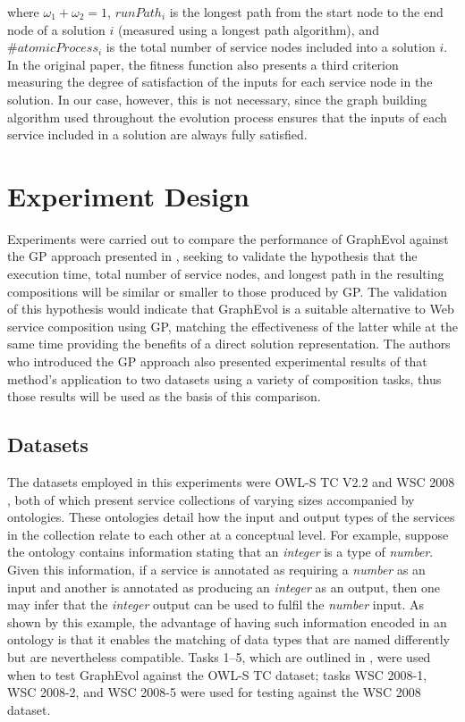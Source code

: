 \documentclass{article}
\begin{document}
\noindent where $ \omega_1 + \omega_2 = 1$, $runPath_i$ is the longest path from the start node to the end node of a solution $i$ (measured using a longest
path algorithm), and $\#atomicProcess_i$ is the total number of service nodes included into a solution $i$. In the original paper, the fitness function also
presents a third criterion measuring the degree of satisfaction of the inputs for each service node in the solution. In our case, however, this is not
necessary, since the graph building algorithm used throughout the evolution process ensures that the inputs of each service included in a solution are
always fully satisfied.

\section{Experiment Design}\label{experimentdesign}
Experiments were carried out to compare the performance of GraphEvol against the GP approach presented in \cite{rodriguez2010composition}, seeking to validate
the hypothesis that the execution time, total number of service nodes, and longest path in the resulting compositions will be similar or smaller to those produced
by GP. The validation of this hypothesis would indicate that GraphEvol is a suitable alternative to Web service composition using GP, matching the effectiveness of the
latter while at the same time providing the benefits of a direct solution representation. The authors who introduced the GP approach also presented experimental
results of that method's application to two datasets using a variety of composition tasks, thus those results will be used as the basis of this comparison.

\subsection{Datasets}
The datasets employed in this experiments were OWL-S TC V2.2 \cite{kuster2008opossum} and WSC 2008 \cite{bansal2008wsc}, both of which present service collections
of varying sizes accompanied by ontologies. These ontologies detail how the input and output types of the services in the collection relate to each other at
a conceptual level. For example, suppose the ontology contains information stating that an \textit{integer} is a type of \textit{number}. Given this information,
if a service is annotated as requiring a \textit{number} as an input and another is annotated as producing an \textit{integer} as an output, then one may infer
that the \textit{integer} output can be used to fulfil the \textit{number} input. As shown by this example, the advantage of having such information encoded in an
ontology is that it enables the matching of data types that are named differently but are nevertheless compatible. Tasks 1--5, which are outlined in \cite{rodriguez2010composition},
were used when to test GraphEvol against the OWL-S TC dataset; tasks WSC 2008-1, WSC 2008-2, and WSC 2008-5 were used for testing against the WSC 2008 dataset.
\end{document}
